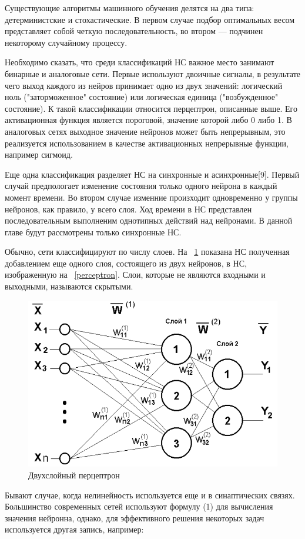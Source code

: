\documentclass[a4paper,english,russian]{G2-105}
\begin{document}
\par Существующие алгоритмы машинного обучения делятся на два типа: детерминистские и стохастические. В первом случае подбор оптимальных весом представляет собой четкую последовательность, во втором --- подчинен некоторому случайному процессу. 
\par Необходимо сказать, что среди классификаций НС важное место занимают бинарные и аналоговые сети. Первые используют двоичные сигналы, в результате чего выход каждого из нейров принимает одно из двух значений: логический ноль ("заторможенное" состояние) или логическая единица ("возбужденное" состояние). К такой классификации относится перцептрон, описанные выше. Его активационная функция является пороговой, значение которой либо 0 либо 1. В аналоговых сетях выходное значение нейронов может быть непрерывным, это реализуется использованием в качестве активационных непрерывные функции, например сигмоид. 
\par Еще одна классификация разделяет НС на синхронные и асинхронные[9]. Первый случай предпологает изменение состояния только одного нейрона в каждый момент времени. Во втором случае изменние произходит одновременно у группы нейронов, как правило, у всего слоя. Ход времени в НС представлен последовательным выполненим однотипных действий над нейронами. В данной главе будут рассмотрены только синхронные НС.
\par Обычно, сети классифицируют по числу слоев. На ~\ref{perceptron2} показана НС полученная добавлением еще одного слоя, состоящего из двух нейронов, в НС, изображенную на ~\ref{perceptron}. Слои, которые не являются входными и выходными, называются скрытыми. 
\begin{figure}
    \includegraphics[width=0.6\linewidth]{perceptron2.png}
    \caption{Двухслойный перцептрон}
	\label{perceptron2}
\end{figure} 
\par Бывают случае, когда нелинейность используется еще и в синаптических связях. Большинство современных сетей используют формулу (1) для вычисления значения нейронна, однако, для эффективного решения некоторых задач используется другая запись, например:
\end{document}
